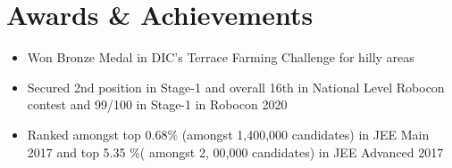 \documentclass[a4paper,11pt]{article}
\newcommand{\customHeading}[1]{
    \section{\texorpdfstring{#1 \hrulefill}{}}
}
\begin{document}
\customHeading{Awards \& Achievements}
\begin{minipage}[t]{\linewidth}
    \begin{itemize}[nosep,after=\strut, leftmargin=1em, itemsep=3pt]
        \item Won Bronze Medal in DIC’s Terrace Farming Challenge for hilly areas
        \item Secured 2nd position in Stage-1 and overall 16th in National Level Robocon contest and 99/100 in Stage-1 in Robocon 2020
        \item  Ranked amongst top 0.68\% (amongst 1,400,000 candidates) in JEE Main 2017 and top 5.35 \%( amongst 2, 00,000 candidates) in JEE Advanced 2017
    \end{itemize}
\end{minipage}


\begin{refsection}
\nocite{*}
\end{refsection}



\vfill
{}
\end{document}
